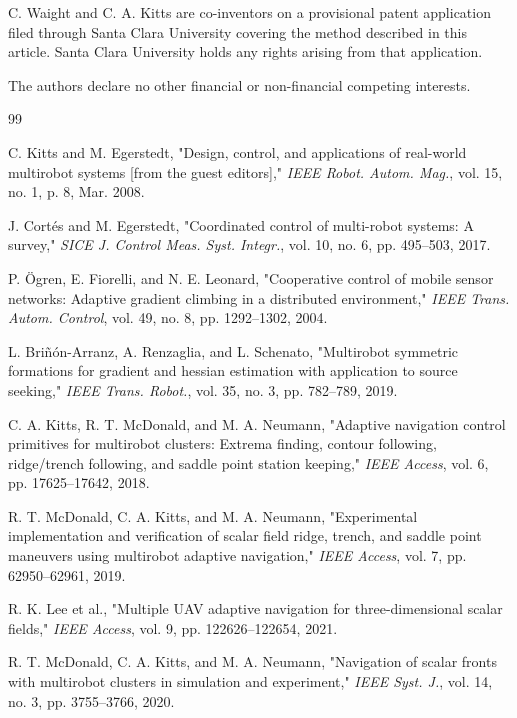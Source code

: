 \documentclass[lettersize,journal]{IEEEtran}
\begin{document}
C. Waight and C. A. Kitts are co-inventors on a provisional patent application filed through Santa Clara University covering the method described in this article. Santa Clara University holds any rights arising from that application.

The authors declare no other financial or non-financial competing interests.


\begin{thebibliography}{99}

 C. Kitts and M. Egerstedt, "Design, control, and applications of real-world multirobot systems [from the guest editors]," \textit{IEEE Robot. Autom. Mag.}, vol. 15, no. 1, p. 8, Mar. 2008.

 J. Cortés and M. Egerstedt, "Coordinated control of multi-robot systems: A survey," \textit{SICE J. Control Meas. Syst. Integr.}, vol. 10, no. 6, pp. 495--503, 2017.

 P. Ögren, E. Fiorelli, and N. E. Leonard, "Cooperative control of mobile sensor networks: Adaptive gradient climbing in a distributed environment," \textit{IEEE Trans. Autom. Control}, vol. 49, no. 8, pp. 1292--1302, 2004.

 L. Briñón-Arranz, A. Renzaglia, and L. Schenato, "Multirobot symmetric formations for gradient and hessian estimation with application to source seeking," \textit{IEEE Trans. Robot.}, vol. 35, no. 3, pp. 782--789, 2019.

 C. A. Kitts, R. T. McDonald, and M. A. Neumann, "Adaptive navigation control primitives for multirobot clusters: Extrema finding, contour following, ridge/trench following, and saddle point station keeping," \textit{IEEE Access}, vol. 6, pp. 17625--17642, 2018.

 R. T. McDonald, C. A. Kitts, and M. A. Neumann, "Experimental implementation and verification of scalar field ridge, trench, and saddle point maneuvers using multirobot adaptive navigation," \textit{IEEE Access}, vol. 7, pp. 62950--62961, 2019.

 R. K. Lee et al., "Multiple UAV adaptive navigation for three-dimensional scalar fields," \textit{IEEE Access}, vol. 9, pp. 122626--122654, 2021.

 R. T. McDonald, C. A. Kitts, and M. A. Neumann, "Navigation of scalar fronts with multirobot clusters in simulation and experiment," \textit{IEEE Syst. J.}, vol. 14, no. 3, pp. 3755--3766, 2020.


\end{thebibliography}
\end{document}

